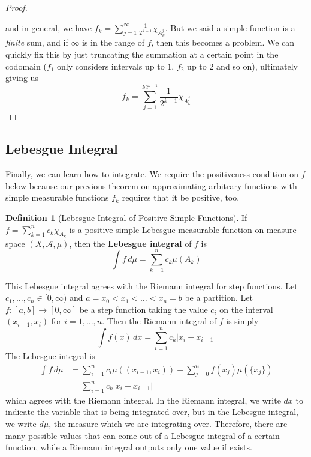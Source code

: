 \documentclass{article}
\theoremstyle{remark}
\theoremstyle{definition}
\newtheorem{definition}{Definition}[section]
\begin{document}
\begin{proof}
\begin{center}
\end{center}
and in general, we have $f_k = \sum_{j=1}^\infty \frac{1}{2^{k-1}} \chi_{A^j_k}$. But we said a simple function is a \textit{finite} sum, and if $\infty$ is in the range of $f$, then this becomes a problem. We can quickly fix this by just truncating the summation at a certain point in the codomain ($f_1$ only considers intervals up to $1$, $f_2$ up to $2$ and so on), ultimately giving us 
\[f_k = \sum_{j=1}^{k 2^{k-1}} \frac{1}{2^{k-1}} \chi_{A^j_k} \]
\end{proof}

\subsection{Lebesgue Integral}

Finally, we can learn how to integrate. We require the positiveness condition on $f$ below because our previous theorem on approximating arbitrary functions with simple measurable functions $f_k$ requires that it be positive, too. 

\begin{definition}[Lebesgue Integral of Positive Simple Functions]
If $f = \sum_{k=1}^n c_k \chi_{A_k}$ is a positive simple Lebesgue measurable function on measure space $(X, \mathcal{A}, \mu)$, then the \textbf{Lebesgue integral} of $f$ is 
\[\int f \, d\mu = \sum_{k=1}^n c_k \mu(A_k)\]
\end{definition}

This Lebesgue integral agrees with the Riemann integral for step functions. Let $c_1, \ldots, c_n \in [0, \infty)$ and $a = x_0 < x_1 < \ldots < x_n = b$ be a partition. Let $f: [a, b] \longrightarrow [0, \infty]$ be a step function taking the value $c_i$ on the interval $(x_{i-1}, x_i)$ for $i = 1, \ldots, n$. Then the Riemann integral of $f$ is simply 
\[\int f(x) \,dx = \sum_{i=1}^n c_k |x_i - x_{i-1}|\]
The Lebesgue integral is 
\begin{align*}
    \int f \, d \mu & = \sum_{i=1}^n c_i \mu((x_{i-1}, x_i)) + \sum_{j=0}^n f(x_j) \mu(\{x_j\}) \\
    & = \sum_{i=1}^n c_k |x_i - x_{i-1}|
\end{align*}
which agrees with the Riemann integral. In the Riemann integral, we write $dx$ to indicate the variable that is being integrated over, but in the Lebesgue integral, we write $d \mu$, the measure which we are integrating over. Therefore, there are many possible values that can come out of a Lebesgue integral of a certain function, while a Riemann integral outputs only one value if exists. 
\end{document}
